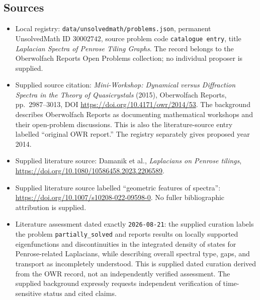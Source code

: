 \documentclass[11pt]{article}
\begin{document}
\subsection{Sources}
\begin{itemize}
\item Local registry: \texttt{data/unsolvedmath/problems.json}, permanent UnsolvedMath ID \(30002742\), source problem code \texttt{catalogue entry}, title \emph{Laplacian Spectra of Penrose Tiling Graphs}. The record belongs to the Oberwolfach Reports Open Problems collection; no individual proposer is supplied.
\item Supplied source citation: \emph{Mini-Workshop: Dynamical versus Diffraction Spectra in the Theory of Quasicrystals} (2015), Oberwolfach Reports, pp.\ 2987--3013, DOI \url{https://doi.org/10.4171/owr/2014/53}. The background describes Oberwolfach Reports as documenting mathematical workshops and their open-problem discussions. This is also the literature-source entry labelled ``original OWR report.'' The registry separately gives proposed year 2014.
\item Supplied literature source: Damanik et al., \emph{Laplacians on Penrose tilings}, \url{https://doi.org/10.1080/10586458.2023.2206589}.
\item Supplied literature source labelled ``geometric features of spectra'': \url{https://doi.org/10.1007/s10208-022-09598-0}. No fuller bibliographic attribution is supplied.
\item Literature assessment dated exactly \texttt{2026-08-21}: the supplied curation labels the problem \texttt{partially\_solved} and reports results on locally supported eigenfunctions and discontinuities in the integrated density of states for Penrose-related Laplacians, while describing overall spectral type, gaps, and transport as incompletely understood. This is supplied dated curation derived from the OWR record, not an independently verified assessment. The supplied background expressly requests independent verification of time-sensitive status and cited claims.
\end{itemize}
\end{document}
